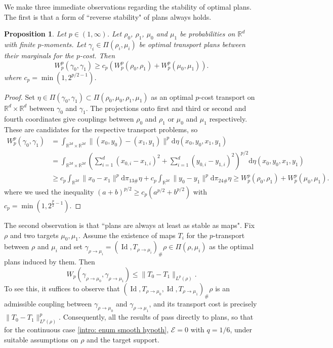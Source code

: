 \documentclass[11pt, oneside, titlepage]{book}
\theoremstyle{plain}
\newtheorem{proposition}[theorem]{Proposition}
\theoremstyle{definition}
\newcommand{\R}{\mathbb{R}}
\newcommand{\di}{\mathrm{d}}
\DeclareMathOperator{\id}{Id}
\begin{document}
We make three immediate observations regarding the stability of optimal plans. The first is that a form of ``reverse stability" of plans always holds.
\begin{proposition}
\label{prop:reverse stability}
    Let $p \in (1, \infty) $. Let $\rho_0$, $\rho_1$, $\mu_0$ and $\mu_1$ be probabilities on $\R^d$ with finite $p$-moments. Let $\gamma_i \in \Pi(\rho_i, \mu_i)$ be optimal transport plans between their marginals for the $p$-cost. Then
    \begin{equation*}
        W_p^p(\gamma_0, \gamma_1) \geq c_p(W_p^p(\rho_0, \rho_1) + W_p^p(\mu_0, \mu_1)).
    \end{equation*}
where $c_p = \min(1, 2^{p/2-1})$.
\end{proposition}
\begin{proof}
    Set $\eta \in \Pi(\gamma_0, \gamma_1) \subset\Pi(\rho_0, \mu_0, \rho_1, \mu_1)$ as an optimal $p$-cost transport on $\R^d \times \R^d$ between $\gamma_0$ and $\gamma_1$. The projections onto first and third or second and fourth coordinates give couplings between $ \rho_0$ and $\rho_1$ or $\mu_0$ and $\mu_1$ respectively. These are candidates for the respective transport problems, so
    \begin{align*}
        W_p^p(\gamma_0, \gamma_1) &= \int_{\R^{2d} \times \R^{2d}} \|(x_0, y_0) - (x_1, y_1)\|^p \di \eta(x_0, y_0, x_1, y_1)\\
        &= \int_{\R^{2d} \times \R^{2d}} \left( \sum_{i=1}^d (x_{0, i} - x_{1,i})^2 + \sum_{i=1}^d (y_{0, i} - y_{1,i})^2 \right)^{p/2} \di \eta(x_0, y_0, x_1, y_1)\\
        &\geq c_p \int_{\R^{2d}} \|x_0 - x_1\|^p \di \pi_{13\#}\eta + c_p\int_{\R^{2d}} \|y_0 - y_1\|^p \di \pi_{24\#}\eta \geq  W_p^p(\rho_0, \rho_1) + W_p^p(\mu_0, \mu_1).
    \end{align*}
where we used the inequality $(a+b)^{p/2} \geq c_p (a^{p/2} + b^{p/2})$ with $c_p = \min(1, 2^{\frac{p}{2}-1})$.
\end{proof}
The second observation is that ``plans are always at least as stable as maps". Fix $\rho$ and two targets $\mu_0, \mu_1$. Assume the existence of maps $T_i$ for the $p$-transport between $\rho$ and $\mu_i$ and set $\gamma_{\rho \to \mu_i} = (\id, T_{\rho \to \mu_i})_\# \rho \in \Pi(\rho, \mu_i)$ as the optimal plans induced by them. Then
\begin{equation}
\label{eq: plans better than maps}
    W_p(\gamma_{\rho \to \mu_0}, \gamma_{\rho \to \mu_1}) \leq \| T_0 - T_1 \|_{L^p(\rho)}.
\end{equation}
To see this, it suffices to observe that $(\id, T_{\rho \to \mu_0}, \id, T_{\rho \to \mu_1})_{\#}\rho$ is an admissible coupling between $\gamma_{\rho \to \mu_0}$ and $ \gamma_{\rho \to \mu_1}$, and its transport cost is precisely $\| T_0 - T_1 \|_{L^p(\rho)}^p$. Consequently, all the results of \cite{delalande2023quantitative, letrouit2024gluing} pass directly to plans, so that for the continuous case \ref{intro: enum smooth hypoth}, $\mathcal{E} = 0$ with $q=1/6$, under suitable assumptions on $\rho$ and the target support.
\end{document}
